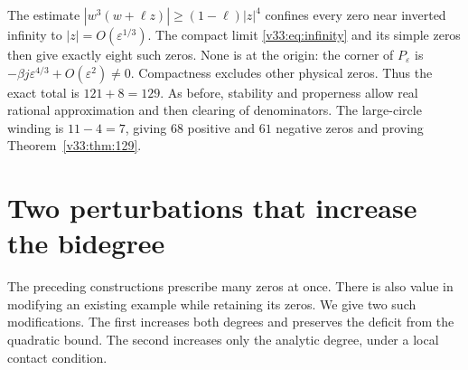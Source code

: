 \documentclass[UTF8,11pt]{ctexart}
\theoremstyle{definition}
\numberwithin{equation}{section}
\begin{document}
The estimate $|w^3(w+\ell z)|\ge(1-\ell)|z|^4$ confines
every zero near inverted infinity to $|z|=O(\varepsilon^{1/3})$.
The compact limit \eqref{v33:eq:infinity} and its simple zeros
then give exactly eight such zeros. None is at the origin:
the corner of $P_\varepsilon$ is
$-\beta j\varepsilon^{4/3}+O(\varepsilon^2)\ne0$.
Compactness excludes other physical zeros. Thus the exact
total is $121+8=129$. As before, stability and properness
allow real rational approximation and then clearing of
denominators. The large-circle winding is $11-4=7$, giving
$68$ positive and $61$ negative zeros and proving
Theorem~\ref{v33:thm:129}.


\section{Two perturbations that increase the bidegree}\label{b:sec:perturbations}

The preceding constructions prescribe many zeros at once. There is also
value in modifying an existing example while retaining its zeros.
We give two such modifications. The first increases both degrees and
preserves the deficit from the quadratic bound. The second increases
only the analytic degree, under a local contact condition.
\end{document}

